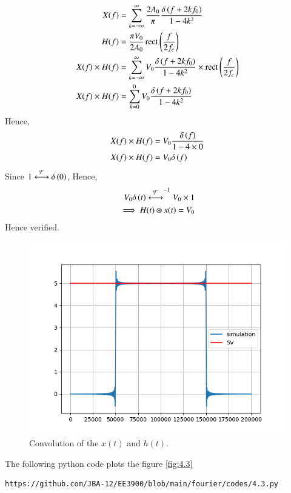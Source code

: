 \documentclass[journal,12pt,twocolumn]{IEEEtran}
\renewcommand\thesection{\arabic{section}}
\begin{document}
\begin{enumerate}[label=\thesection.\arabic*
	,ref=\thesection.\theenumi]
	\begin{align}
		X(f)&=\sum_{k=-\infty}^{\infty} \frac{2A_0}{\pi} \frac{\delta\left(f+2kf_0\right)}{1-4k^2}\\
		H(f)&=\frac{\pi V_0}{2A_0}\mathop{\mathrm{rect}}{\left(\frac{f}{2f_c}\right)}\\
		X(f) \times H(f)&=\sum_{k=-\infty}^{\infty} V_0 \frac{\delta\left(f+2kf_0\right)}{1-4k^2} \times \mathop{\mathrm{rect}}{\left(\frac{f}{2f_c}\right)}\\
		X(f)\times H(f)&=\sum_{k=0}^{0} V_0 \frac{\delta\left(f+2kf_0\right)}{1-4k^2}
	\end{align} 
	Hence,
	\begin{align}
		X(f)\times H(f)&=V_0 \frac{\delta\left(f\right)}{1-4 \times 0}\\
		X(f)\times H(f)&=V_0 \delta\left(f\right)
	\end{align} 
Since $1\overset{\mathcal{F}}{ \longleftrightarrow} \delta\left(0\right)$,
Hence, 
\begin{align}
V_0 \delta\left(t\right) \overset{\mathcal{F}}{ \longleftrightarrow}^{-1} V_0\times 1	\\
\implies H(t) \circledast x(t)=V_0
\end{align}
Hence verified.
	\begin{figure}[!ht]
			\includegraphics[width=\columnwidth]{figs/4.3.png}
			\caption{Convolution of the $x(t)$ and $h(t)$.}
			\label{eq:fig:4.3}
		\end{figure}
The following python code plots the figure \ref{fig:4.3}
\begin{lstlisting}
https://github.com/JBA-12/EE3900/blob/main/fourier/codes/4.3.py
\end{lstlisting} 
\end{enumerate}
\end{document}
